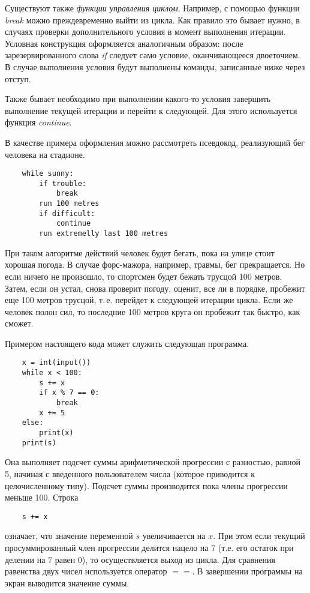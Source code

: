 \documentclass[a4paper, fleqn]{article}
\begin{document}
	Существуют также \emph{функции управления циклом}. Например, с помощью функции \emph{break} можно преждевременно выйти из цикла. Как правило это бывает нужно, в случаях проверки дополнительного условия в момент выполнения итерации. Условная конструкция оформляется аналогичным образом: после зарезервированного слова \emph{if} следует само условие, оканчивающееся двоеточием. В случае выполнения условия будут выполнены команды, записанные ниже через отступ.
	
	Также бывает необходимо при выполнении какого-то условия завершить выполнение текущей итерации и перейти к следующей.
	Для этого используется функция \emph{continue}.
	
	В качестве примера оформления можно рассмотреть псевдокод, реализующий бег человека на стадионе.
	\begin{lstlisting}
	while sunny:
		if trouble:
			break
		run 100 metres
		if difficult:
			continue
		run extremelly last 100 metres	
	\end{lstlisting}
	
	При таком алгоритме действий человек будет бегать, пока на улице стоит хорошая погода. В случае форс-мажора, например, травмы, бег прекращается. Но если ничего не произошло, то спортсмен будет бежать трусцой 100 метров. Затем, если он устал, снова проверит погоду, оценит, все ли в порядке, пробежит еще 100 метров трусцой, т.\,е. перейдет к следующей итерации цикла. Если же человек полон сил, то последние 100 метров круга он пробежит так быстро, как сможет.
	
	Примером настоящего кода может служить следующая программа.
	\begin{lstlisting}
	x = int(input())
	while x < 100:
		s += x
		if x % 7 == 0:
			break
		x += 5
	else: 
		print(x)
	print(s)
	\end{lstlisting}
	
	Она выполняет подсчет суммы арифметической прогрессии с разностью, равной 5,  начиная с введенного пользователем числа (которое приводится к целочисленному типу). Подсчет суммы производится пока члены прогрессии меньше 100. Строка
	\begin{lstlisting}
	s += x
	\end{lstlisting}
	
	означает, что значение переменной $s$  увеличивается на $x$. При этом если текущий просуммированный член прогрессии делится нацело на $7$ (т.е. его остаток при делении на $7$ равен $0$), то осуществляется выход из цикла. Для сравнения равенства двух чисел используется оператор $==$.
	В завершении программы на экран выводится значение суммы.
	
\end{document}
